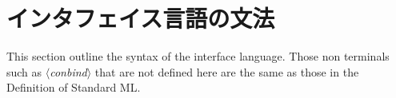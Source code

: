\documentclass{jbook}
\newif\ifjp
\newcommand{\txt}[2]{#1}
\newcommand{\smlsharp}{SML\#}
\newcommand{\nonterm}[1]{\mbox{$\langle$}{\it #1}\mbox{$\rangle$}}
\begin{document}
\section{\txt{インタフェイス言語の文法}{Syntax of the interface language}}
\label{sec:tutorialInterfaceSyntax}

\ifjp%
	インタフェイス言語の文法の概要を以下に示します．
	\nonterm{conbind}などの定義が無い非終端記号は，The Definition of
Standard MLの同名のものと同一です．
	詳細な定義は
第\ref{part:referenceManual}部を参照ください．

\else%
	This section outline the syntax of the interface language.
	Those non terminals such as \nonterm{conbind} that are not
defined here are the same as those in the Definition of Standard ML.
\fi%
\end{document}
